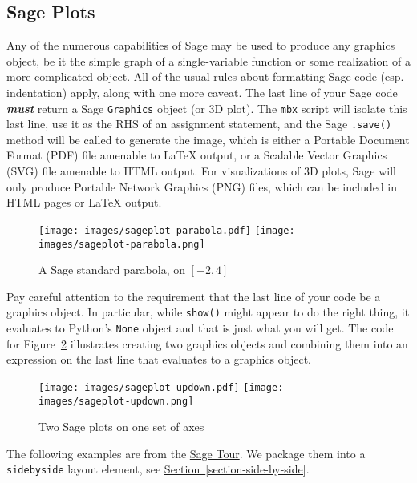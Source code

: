 \documentclass[10pt,]{article}
\newcommand{\alert}[1]{\textbf{\textit{#1}}}
\theoremstyle{plain}
\theoremstyle{definition}
\theoremstyle{definition}
\theoremstyle{definition}
\theoremstyle{definition}
\theoremstyle{definition}
\theoremstyle{definition}
\numberwithin{equation}{section}
\begin{document}
\subsection[{Sage Plots}]{Sage Plots}\label{subsection-22}
\hypertarget{p-264}{}%
Any of the numerous capabilities of Sage may be used to produce any graphics object, be it the simple graph of a single-variable function or some realization of a more complicated object.  All of the usual rules about formatting Sage code (esp. indentation) apply, along with one more caveat.  The last line of your Sage code \alert{must} return a Sage \lstinline?Graphics? object (or 3D plot).  The \lstinline?mbx? script will isolate this last line, use it as the RHS of an assignment statement, and the Sage \lstinline?.save()? method will be called to generate the image, which is either a Portable Document Format (PDF) file amenable to \LaTeX{} output, or a Scalable Vector Graphics (SVG) file amenable to HTML output.  For visualizations of 3D plots, Sage will only produce Portable Network Graphics (PNG) files, which can be included in HTML pages or \LaTeX{} output.%
\begin{figure}
\centering
{}%
{\texttt{[image: images/sageplot-parabola.pdf]}}%
{\texttt{[image: images/sageplot-parabola.png]}}
\caption{A Sage standard parabola, on \([-2,4]\)\label{figure-sage-parabola}}
\end{figure}
\hypertarget{p-265}{}%
Pay careful attention to the requirement that the last line of your code be a graphics object.  In particular, while \lstinline?show()? might appear to do the right thing, it evaluates to Python's \lstinline?None? object and that is just what you will get.  The code for Figure~\hyperref[figure-sage-double-plot]{\ref{figure-sage-double-plot}} illustrates creating two graphics objects and combining them into an expression on the last line that evaluates to a graphics object.%
\begin{figure}
\centering
{}%
{\texttt{[image: images/sageplot-updown.pdf]}}%
{\texttt{[image: images/sageplot-updown.png]}}
\caption{Two Sage plots on one set of axes\label{figure-sage-double-plot}}
\end{figure}
\hypertarget{p-266}{}%
The following examples are from the \href{http://www.sagemath.org/tour-graphics.html}{Sage Tour}.  We package them into a \lstinline?sidebyside? layout element, see \hyperref[section-side-by-side]{Section~\ref{section-side-by-side}}.%
\end{document}
